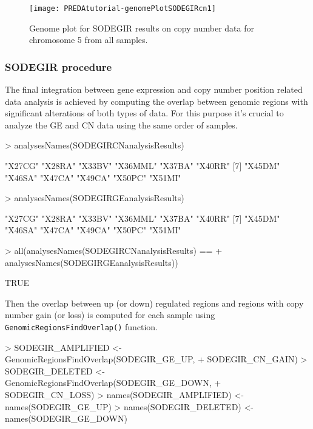 \documentclass[a4paper,10pt]{article}
\begin{document}
\begin{figure}[htbp]
 \centering
\texttt{[image: PREDAtutorial-genomePlotSODEGIRcn1]}
 \caption{Genome plot for SODEGIR results on copy number data for chromosome 5 from all samples.}
 \label{fig:genomePlotSODEGIRcnOnechromosome}
\end{figure}



\subsubsection{SODEGIR procedure}
The final integration between gene expression and copy number position related data analysis is achieved by computing the overlap between genomic regions with significant alterations of both types of data. For this purpose it's crucial to analyze the GE and CN data using the same order of samples.

\begin{Schunk}
\begin{Sinput}
> analysesNames(SODEGIRCNanalysisResults)
\end{Sinput}
\begin{Soutput}
 [1] "X27CG"  "X28RA"  "X33BV"  "X36MML" "X37BA"  "X40RR" 
 [7] "X45DM"  "X46SA"  "X47CA"  "X49CA"  "X50PC"  "X51MI" 
\end{Soutput}
\begin{Sinput}
> analysesNames(SODEGIRGEanalysisResults)
\end{Sinput}
\begin{Soutput}
 [1] "X27CG"  "X28RA"  "X33BV"  "X36MML" "X37BA"  "X40RR" 
 [7] "X45DM"  "X46SA"  "X47CA"  "X49CA"  "X50PC"  "X51MI" 
\end{Soutput}
\begin{Sinput}
> all(analysesNames(SODEGIRCNanalysisResults) == 
+     analysesNames(SODEGIRGEanalysisResults))
\end{Sinput}
\begin{Soutput}
[1] TRUE
\end{Soutput}
\end{Schunk}

Then the overlap between up (or down) regulated regions and regions with copy number gain (or loss) is computed for each sample using \texttt{GenomicRegionsFindOverlap()} function.

\begin{Schunk}
\begin{Sinput}
> SODEGIR_AMPLIFIED <- GenomicRegionsFindOverlap(SODEGIR_GE_UP, 
+     SODEGIR_CN_GAIN)
> SODEGIR_DELETED <- GenomicRegionsFindOverlap(SODEGIR_GE_DOWN, 
+     SODEGIR_CN_LOSS)
> names(SODEGIR_AMPLIFIED) <- names(SODEGIR_GE_UP)
> names(SODEGIR_DELETED) <- names(SODEGIR_GE_DOWN)
\end{Sinput}
\end{Schunk}
\end{document}
